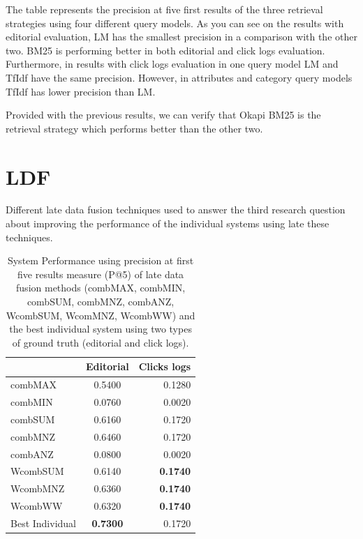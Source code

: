 The table represents the precision at five first results of the three retrieval strategies using four different query models. As you can see on the results with editorial evaluation, LM has the smallest precision in a comparison with the other two. BM25 is performing better in both editorial and click logs evaluation. Furthermore, in results with click logs evaluation in one query model LM and TfIdf have the same precision. However, in attributes and category query models TfIdf has lower precision than LM.

Provided with the previous results, we can verify that Okapi BM25 is the retrieval strategy which performs better than the other two.


\section{LDF}

Different late data fusion techniques used to answer the third research question about improving the performance of the individual systems using late these techniques.

\begin{table}[H]
\begin{center}
\footnotesize
\caption{System Performance using precision at first five results measure (P@5) of late data fusion methods (combMAX, combMIN, combSUM, combMNZ, combANZ, WcombSUM, WcomMNZ, WcombWW) and the best individual system using two types of ground truth (editorial and click logs).}
\label{table:ldfP5}

\begin{tabular}{lcr}
\midrule
  & Editorial & Clicks logs\\
 \midrule
	combMAX & 0.5400 & 0.1280\\
	combMIN & 0.0760 & 0.0020 \\
	combSUM & 0.6160 & 0.1720 \\
	combMNZ & 0.6460 & 0.1720 \\
	combANZ & 0.0800 & 0.0020 \\
	WcombSUM & 0.6140 & \textbf{0.1740} \\
	WcombMNZ & 0.6360 & \textbf{0.1740} \\
	WcombWW & 0.6320 & \textbf{0.1740} \\
	Best Individual & \textbf{0.7300} & 0.1720 \\
\bottomrule
\end{tabular}
\end{center}
\end{table}


